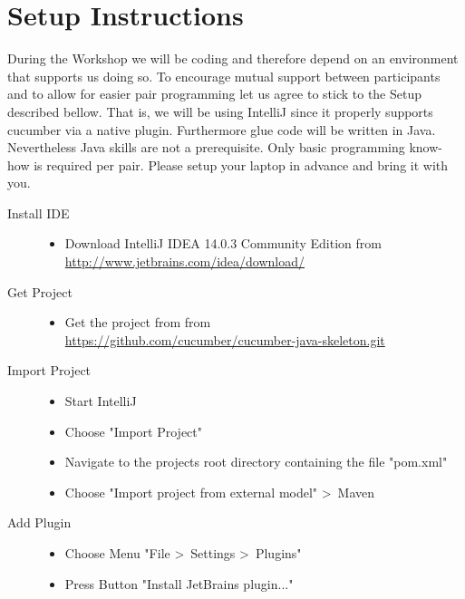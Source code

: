 \documentclass{article}
\begin{document}
\thispagestyle{empty}

\section*{Setup Instructions}
During the Workshop we will be coding and therefore depend on an environment that supports us doing so. To encourage mutual support between participants and to allow for easier pair programming let us agree to stick to the Setup described bellow. That is, we will be using IntelliJ since it properly supports cucumber via a native plugin. Furthermore glue code will be written in Java. Nevertheless Java skills are not a prerequisite. Only basic programming know-how is required per pair. Please setup your laptop in advance and bring it with you.
  
	\begin{description}
		\item[Install IDE] \hfill
		\begin{itemize}
			\item Download IntelliJ IDEA 14.0.3 Community Edition from\\
                	\url{http://www.jetbrains.com/idea/download/}
		\end{itemize}
		\item[Get Project] \hfill
		\begin{itemize} 
                	\item Get the project from from\\
                \url{https://github.com/cucumber/cucumber-java-skeleton.git}
                \end{itemize}
                \item[Import Project] \hfill
                \begin{itemize}
                        \item Start IntelliJ 
		        \item Choose "Import Project"
			\item Navigate to the projects root directory containing the file "pom.xml"
       	        	\item Choose "Import project from external model" \textgreater\ Maven
		\end{itemize}
		\item[Add Plugin] \hfill
		\begin{itemize}
	                \item Choose Menu "File \textgreater\ Settings \textgreater\ Plugins"
		        \item Press Button "Install JetBrains plugin..."

\end{itemize}
\end{description}
\end{document}
